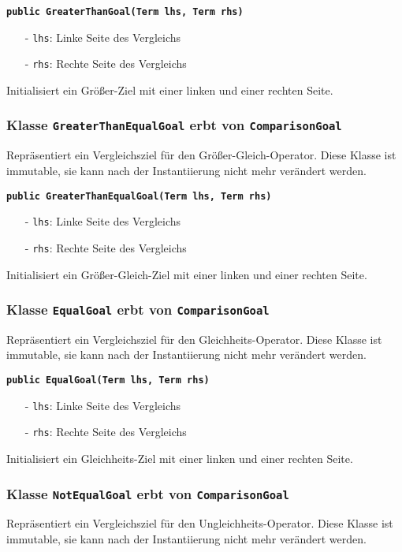 \documentclass[parskip=full,11pt,twoside]{scrartcl}
\begin{document}
\textbf{\texttt{public GreaterThanGoal(Term lhs, Term rhs)}}
\begin{itemize}[noitemsep]
	\item[-] \texttt{lhs}: Linke Seite des Vergleichs
	\item[-] \texttt{rhs}: Rechte Seite des Vergleichs
\end{itemize}
Initialisiert ein Größer-Ziel mit einer linken und einer rechten Seite.

\subsubsection{Klasse \texttt{GreaterThanEqualGoal} erbt von \texttt{ComparisonGoal}}
Repräsentiert ein Vergleichsziel für den Größer-Gleich-Operator. Diese Klasse ist immutable, sie kann nach der Instantiierung nicht mehr verändert werden.

\textbf{\texttt{public GreaterThanEqualGoal(Term lhs, Term rhs)}}
\begin{itemize}[noitemsep]
	\item[-] \texttt{lhs}: Linke Seite des Vergleichs
	\item[-] \texttt{rhs}: Rechte Seite des Vergleichs
\end{itemize}
Initialisiert ein Größer-Gleich-Ziel mit einer linken und einer rechten Seite.

\subsubsection{Klasse \texttt{EqualGoal} erbt von \texttt{ComparisonGoal}}
Repräsentiert ein Vergleichsziel für den Gleichheits-Operator. Diese Klasse ist immutable, sie kann nach der Instantiierung nicht mehr verändert werden.

\textbf{\texttt{public EqualGoal(Term lhs, Term rhs)}}
\begin{itemize}[noitemsep]
	\item[-] \texttt{lhs}: Linke Seite des Vergleichs
	\item[-] \texttt{rhs}: Rechte Seite des Vergleichs
\end{itemize}
Initialisiert ein Gleichheits-Ziel mit einer linken und einer rechten Seite.

\subsubsection{Klasse \texttt{NotEqualGoal} erbt von \texttt{ComparisonGoal}}
Repräsentiert ein Vergleichsziel für den Ungleichheits-Operator. Diese Klasse ist immutable, sie kann nach der Instantiierung nicht mehr verändert werden.
\end{document}
